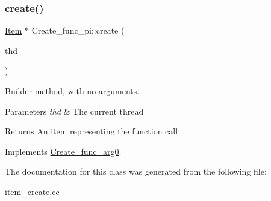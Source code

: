 \subsubsection{\texorpdfstring{create()}{create()}}
{\footnotesize\ttfamily \mbox{\hyperlink{classItem}{Item}} $\ast$ Create\+\_\+func\+\_\+pi\+::create (\begin{DoxyParamCaption}\item[{T\+HD $\ast$}]{thd }\end{DoxyParamCaption})\hspace{0.3cm}{\ttfamily [virtual]}}

Builder method, with no arguments. 
\begin{DoxyParams}{Parameters}
{\em thd} & The current thread \\
\hline
\end{DoxyParams}
\begin{DoxyReturn}{Returns}
An item representing the function call 
\end{DoxyReturn}


Implements \mbox{\hyperlink{classCreate__func__arg0_abb65b43817f9382759c79487228ee29f}{Create\+\_\+func\+\_\+arg0}}.



The documentation for this class was generated from the following file\+:\begin{DoxyCompactItemize}
\item 
\mbox{\hyperlink{item__create_8cc}{item\+\_\+create.\+cc}}\end{DoxyCompactItemize}

